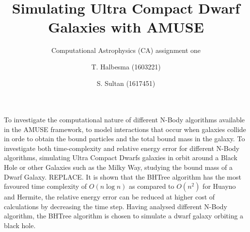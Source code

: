 \documentclass{aa}
\begin{document}
 


   \title{Simulating Ultra Compact Dwarf Galaxies with AMUSE}

   \subtitle{Computational Astrophysics (CA) assignment one}

   \author{T. Halbesma (1603221)
          \and
          S. Sultan (1617451)
          }



 
  \abstract
   {To investigate the computational nature of different N-Body algorithms
   available in the AMUSE framework, to model interactions that occur 
   when galaxies collide in orde to obtain the bound particles and the total
   bound mass in the galaxy.}
   {To investigate both time-complexity and relative energy error for different 
   N-Body algorithms, simulating Ultra Compact Dwarfs galaxies in orbit around
   a Black Hole or other Galaxies such as the Milky Way, studying the bound mass
   of a Dwarf Galaxy.}
   {REPLACE.}
   {It is shown that the BHTree algorithm has the most favoured time complexity
   of $O(n \log n)$ as compared to $O(n^2)$ for Huayno and Hermite, the
   relative energy error can be reduced at higher cost of calculations by decreasing
   the time step. Having analysed different N-Body algorithm, the BHTree algorithm 
   is chosen to simulate a dwarf galaxy orbiting a black hole.}
   {}


   \maketitle
%
\end{document}
